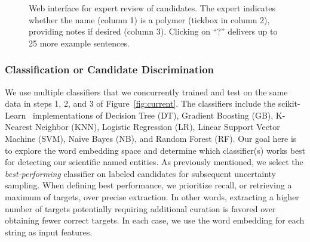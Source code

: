 \begin{figure}
\centering
{}
\caption{\label{fig:polyner} Web interface for expert review of candidates.
The expert indicates whether the name (column 1) is a polymer (tickbox in column 2), 
providing notes if desired (column 3). 
Clicking on ``?'' delivers up to 25 more example sentences.
}
\end{figure}

\subsubsection{Classification or Candidate Discrimination}
We use multiple classifiers that we concurrently trained and test on the same data in steps 1, 2, and 3 of Figure~\ref{fig:current}.
The classifiers include the scikit-Learn~\cite{scikit-learn} implementations of Decision Tree (DT), Gradient Boosting (GB), K-Nearest Neighbor (KNN), Logistic Regression (LR), Linear Support Vector Machine (SVM), Naive Bayes (NB), and Random Forest (RF). 
Our goal here is to explore the word embedding space and determine which classifier(s) works best for detecting our scientific named entities.
As previously mentioned, we select%
the \textit{best-performing} classifier on labeled candidates for subsequent uncertainty sampling.
When defining best performance, we prioritize recall, or retrieving a maximum of targets, over precise extraction.
In other words, extracting a higher number of targets potentially requiring additional curation is favored over obtaining fewer correct targets.
In each case, we use the word embedding for each string as input features.




